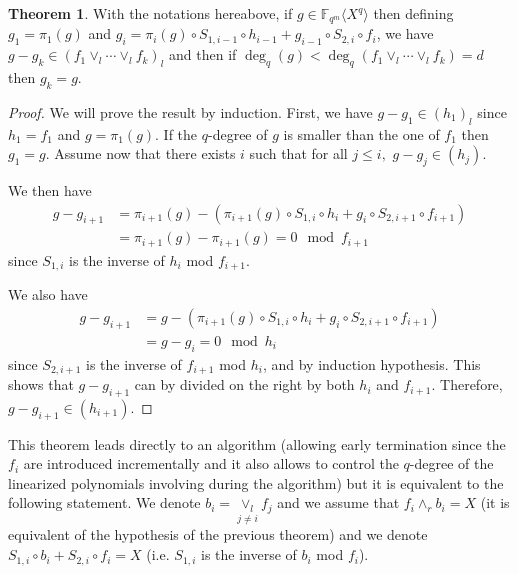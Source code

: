 \documentclass{article}
\theoremstyle{definition}
\newtheorem{theorem}{Theorem}
\begin{document}
\begin{theorem}
      \label{CRT}With the notations hereabove, if $g \in \mathbb{F}_{q^m} \langle
            X^q \rangle$ then defining $g_1 = \pi_1 (g)$ and $g_i = \pi_i(g) \circ S_{1, i-1} \circ h_{i-1} + g_{i-1} \circ S_{2, i} \circ f_i$, we have
      $g - g_k \in (f_1 \vee_l \cdots \vee_l f_k)_l$ and then if $\deg_q
            (g) < \deg_q (f_1 \vee_l \cdots \vee_l f_k) = d$ then $g_k = g$.
\end{theorem}

\begin{proof}
      We will prove the result by induction. First, we have $g - g_1 \in (h_1)_l$
      since $h_1 = f_1$ and $g = \pi_1 (g)$. If the $q$-degree of $g$ is
      smaller than the one of $f_1$ then $g_1 = g$.   Assume now that there exists $i$ such that for all $j\leqslant i,$ $g - g_j \in
            (h_j)$.

      \noindent We then have \begin{align*} g-g_{i+1} & =\pi_{i+1}(g) - (\pi_{i+1}(g) \circ S_{1, i} \circ h_{i} + g_{i} \circ S_{2, i+1} \circ f_{i+1}) \\
                               & = \pi_{i+1}(g) - \pi_{i+1}(g) = 0   \mod f_{i+1}\end{align*} since $ S_{1, i}$ is the inverse of $h_{i}$ mod $f_{i+1}.$

      \noindent We also have \begin{align*}
            g-g_{i+1} & = g - (\pi_{i+1}(g) \circ S_{1, i} \circ h_{i} + g_{i} \circ S_{2, i+1} \circ f_{i+1}) \\
                      & =g- g_{i} =0
            \mod h_{i}
      \end{align*}  since $ S_{2, i+1}$ is the inverse of  $f_{i+1}$ mod $h_{i}$, and by induction hypothesis.
      This shows that $g-g_{i+1} $ can by divided on the right by both $h_i$ and $f_{i+1}$. Therefore, $g - g_{i+1} \in
            (h_{i+1})$.
\end{proof}

\noindent This theorem leads directly to an algorithm (allowing early termination since
the $f_i$ are introduced incrementally and it also allows to control the
$q$-degree of the linearized polynomials involving during the algorithm) but
it is equivalent to the following statement. We denote $b_i = \underset{j \neq
            i}{\vee_l} f_j$ and we assume that $f_i \wedge_r b_i = X$ (it is equivalent of
the hypothesis of the previous theorem) and we denote $S_{1, i} \circ b_i +
      S_{2, i} \circ f_i = X$ (i.e. $S_{1, i}$ is the inverse of $b_i$ mod $f_i$).
\end{document}
